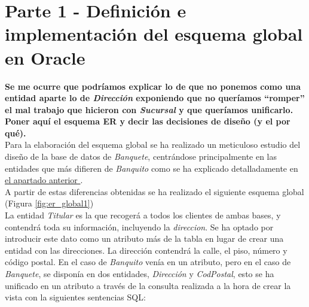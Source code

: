 \documentclass{article}
\begin{document}
\section{Parte 1 - Definición e implementación del esquema global en Oracle}

\textbf{Se me ocurre que podríamos explicar lo de que no ponemos como una entidad aparte lo de \emph{Dirección} exponiendo que no queríamos ``romper'' el mal trabajo que hicieron con \emph{Sucursal} y que queríamos unificarlo.}
\textbf{Poner aquí el esquema ER y decir las decisiones de diseño (y el por qué).}\\

Para la elaboración del esquema global se ha realizado un meticuloso estudio del diseño de la base de datos de \emph{Banquete}, centrándose principalmente en las entidades que más difieren de \emph{Banquito} como se ha explicado detalladamente en \hyperref[mejoras]{el apartado anterior }.\\
A partir de estas diferencias obtenidas se ha realizado el siguiente esquema global (Figura \ref{fig:er_global1})\\

La entidad \emph{Titular} es la que recogerá a todos los clientes de ambas bases, y contendrá toda su información, incluyendo la \textit{direccion}. Se ha optado por introducir este dato como un atributo más de la tabla en lugar de crear una entidad con las direcciones. La dirección contendrá la calle, el piso, número y código postal. En el caso de \emph{Banquito} venía en un atributo, pero en el caso de \emph{Banquete}, se disponía en dos entidades, \textit{Dirección} y \textit{CodPostal}, esto se ha unificado en un atributo a través de la consulta realizada a la hora de crear la vista con la siguientes sentencias SQL:
\end{document}
